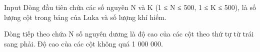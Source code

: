 Input
Dòng đầu tiên chứa các số nguyên N và K (1 ≤ N ≤ 500, 1 ≤ K ≤ 500), là số lượng cột trong bảng của Luka và số lượng khí hiếm.  

   Dòng tiếp theo chứa N số nguyên dương là độ cao của các cột theo thứ tự từ trái sang phải. Độ cao của các cột không quá 1 000 000.